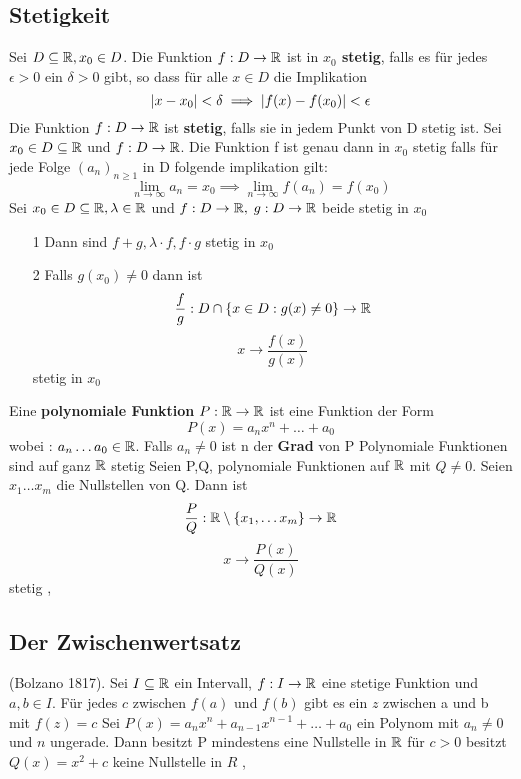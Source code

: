 \subsection{Stetigkeit}
\Def[3.4] Sei \(D \subseteq \mathbb{R}, x_0 \in D\). Die Funktion \(f: D \rightarrow \mathbb{R} \) ist in \textbf{\(x_0\) stetig}, falls es für jedes \(\epsilon > 0 \) ein \(\delta > 0\) gibt, so dass für alle \(x \in D \) die Implikation
\[ \left\lvert x - x_0 \right\rvert < \delta \implies \left\lvert f(x) - f(x_0) \right\rvert < \epsilon\]
\Def[3.5] Die Funktion \(f : D \rightarrow \mathbb{R}\) ist \textbf{stetig}, falls sie in jedem Punkt von D stetig ist. \newline
\Satz[3.7] Sei \(x_0 \in D \subseteq \mathbb{R} \) und \(f: D \rightarrow \mathbb{R} \). Die Funktion f ist genau dann in \(x_0\) stetig falls für jede Folge \((a_n)_{n \geq 1}\) in D folgende implikation gilt:
\[\lim\limits_{n \rightarrow \infty} a_n = x_0 \implies \lim\limits_{n \rightarrow \infty} f(a_n) = f(x_0)\]
\Korollar[3.8] Sei \(x_0 \in D \subseteq \mathbb{R}, \lambda \in \mathbb{R} \) und \(f : D \rightarrow \mathbb{R}, \) \newline \( g: D \rightarrow \mathbb{R}\) beide stetig in \(x_0\)
\begin{enumerate}
    \item [1] Dann sind \(f+g, \lambda \cdot f, f \cdot g\) stetig in \(x_0\)
    \item [2] Falls \(g(x_0) \neq 0\) dann ist
    \[ \frac{f}{g} : D \cap \{x \in D : g(x) \neq 0\} \rightarrow \mathbb{R}\]
    \[x \rightarrow \frac{f(x)}{g(x)}\] stetig in \(x_0\)
\end{enumerate}
\Def[3.9] Eine \textbf{polynomiale Funktion} \(P: \mathbb{R} \rightarrow \mathbb{R}\) ist eine Funktion der Form
\[P(x) = a_nx^n + \dots + a_0\]
wobei : \(a_n \dots a_0 \in \mathbb{R}\). Falls \(a_n \neq 0\) ist n der \textbf{Grad} von P \newline
\Korollar[3.10] Polynomiale Funktionen sind auf ganz \(\mathbb{R}\) stetig \newline
\Korollar[3.11] Seien P,Q, polynomiale Funktionen auf \(\mathbb{R}\) mit \(Q \neq 0\). Seien \(x_1 \dots x_m\) die Nullstellen von Q. Dann ist
\[\frac{P}{Q} : \mathbb{R} \setminus \{x_1, \dots x_m\} \rightarrow \mathbb{R} \]
\[x \rightarrow \frac{P(x)}{Q(x)}\] stetig
\sep
\subsection{Der Zwischenwertsatz}
\Satz[3.12] (Bolzano 1817). Sei \(I \subseteq \mathbb{R} \) ein Intervall, \(f : I \rightarrow \mathbb{R} \) eine stetige Funktion und \(a,b \in I\). Für jedes \(c\) zwischen \(f(a)\) und \(f(b)\) gibt es ein \(z\) zwischen a und b mit \(f(z) = c\) \newline
\Korollar[3.13] Sei \(P(x) = a_nx^n + a_{n-1}x^{n-1} + \dots + a_0\) ein Polynom mit \(a_n \neq 0\) und \(n\) ungerade. Dann besitzt P mindestens eine Nullstelle in \(\mathbb{R}\) \newline
\Bem[3.14] für \(c > 0\) besitzt \(Q(x) = x^2 + c\) keine Nullstelle in \(R\) \newline
\sep
